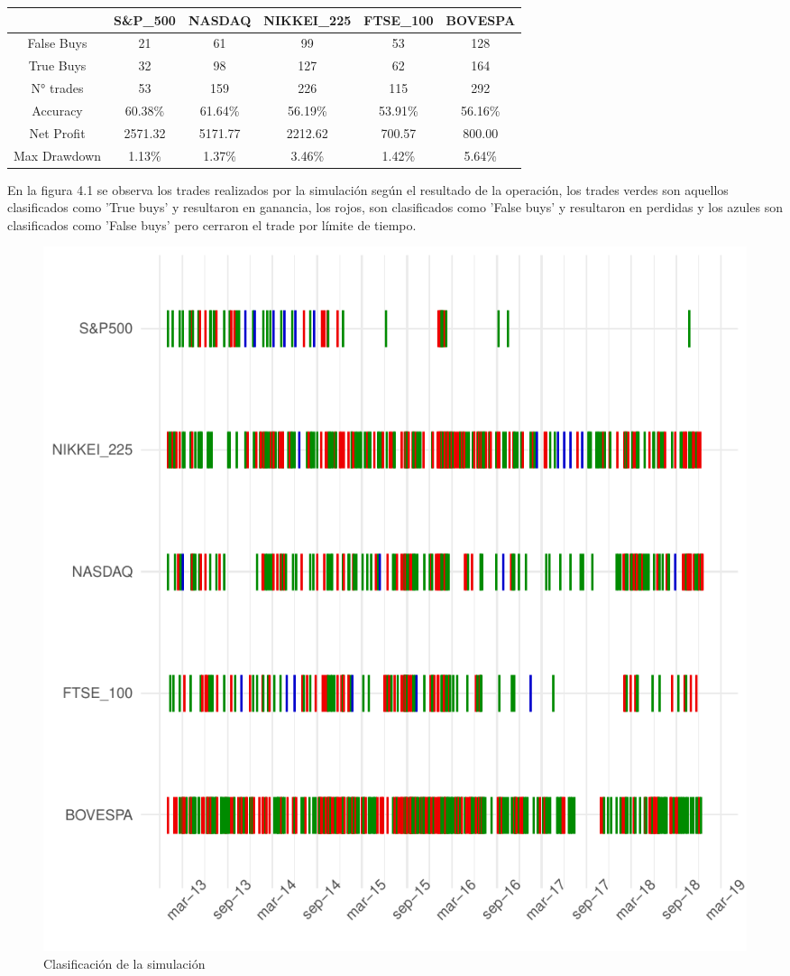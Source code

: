 \documentclass[a4paper,12pt]{Latex/Classes/PhDthesisPSnPDF}
\begin{document}
\begin{center}
\begin{table}[ht]
\centering
\begin{tabular}{cccccc}
  \hline
 & S\&P\_500 & NASDAQ & NIKKEI\_225 & FTSE\_100 & BOVESPA \\ 
  \hline
False Buys & 21 & 61 & 99 & 53 & 128 \\ 
  True Buys & 32 & 98 & 127 & 62 & 164 \\ 
  N° trades & 53 & 159 & 226 & 115 & 292 \\ 
  Accuracy & 60.38\% & 61.64\% & 56.19\% & 53.91\% & 56.16\% \\ 
  Net Profit & 2571.32 & 5171.77 & 2212.62 & 700.57 & 800.00 \\ 
  Max Drawdown & 1.13\% & 1.37\% & 3.46\% & 1.42\% & 5.64\% \\ 
   \hline
\end{tabular}
\end{table}\end{center}
 

En la figura 4.1 se observa los trades realizados por la simulación según el resultado de la operación, los trades verdes son aquellos clasificados como 'True buys' y resultaron en ganancia, los rojos, son clasificados como 'False buys' y resultaron en perdidas y los azules son clasificados como 'False buys' pero cerraron el trade por límite de tiempo.

\begin{figure}[H]
\centering
\includegraphics{main-029}
\caption{Clasificación de la simulación}
\end{figure}
\end{document}
